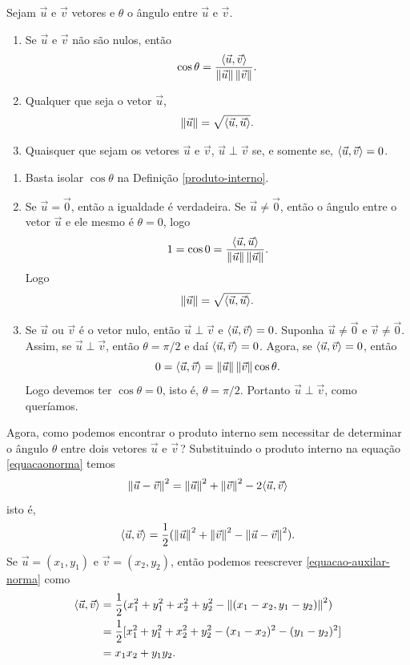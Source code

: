 \begin{proposicao}
    Sejam $\vec{u}$ e $\vec{v}$ vetores e $\theta$ o ângulo entre $\vec{u}$ e $\vec{v}$.
    \begin{enumerate}
        \item Se $\vec{u}$ e $\vec{v}$ não são nulos, então
              \[
                  \cos\theta = \dfrac{\langle \vec{u}, \vec{v} \rangle}{\left\Vert{\vec{u}}\right\Vert\left\Vert{\vec{v}}\right\Vert}.
              \]
        \item Qualquer que seja o vetor $\vec{u}$,
              \[
                  \left\Vert{\vec{u}}\right\Vert = \sqrt{\langle \vec{u}, \vec{u} \rangle}.
              \]
        \item Quaisquer que sejam os vetores $\vec{u}$ e $\vec{v}$, $\vec{u}\perp\vec{v}$ se, e somente se, $\langle \vec{u}, \vec{v} \rangle = 0$.
    \end{enumerate}
\end{proposicao}
\begin{prova}
    \begin{enumerate}
        \item Basta isolar $\cos\theta$ na Definição \ref{produto-interno}.
        \item Se $\vec{u} = \vec{0}$, então a igualdade é verdadeira. Se $\vec{u} \ne \vec{0}$, então o ângulo entre o vetor $\vec{u}$ e ele mesmo é $\theta = 0$, logo
              \[
                  1 = \cos 0 = \dfrac{\langle \vec{u}, \vec{u} \rangle}{\left\Vert{\vec{u}}\right\Vert\left\Vert{\vec{u}}\right\Vert}.
              \]
              Logo
              \[
                  \left\Vert{\vec{u}}\right\Vert = \sqrt{\langle \vec{u}, \vec{u} \rangle}.
              \]
        \item Se $\vec{u}$ ou $\vec{v}$ é o vetor nulo, então $\vec{u}\perp\vec{v}$ e $\langle \vec{u}, \vec{v} \rangle = 0$. Suponha $\vec{u} \ne \vec{0}$ e $\vec{v} \ne \vec{0}$. Assim, se $\vec{u} \perp\vec{v}$, então $\theta = \pi/2$ e daí $\langle \vec{u}, \vec{v} \rangle = 0$. Agora, se $\langle \vec{u}, \vec{v} \rangle = 0$, então
              \[
                  0 = \langle \vec{u}, \vec{v} \rangle = \left\Vert{\vec{u}}\right\Vert\left\Vert{\vec{v}}\right\Vert\cos\theta.
              \]
              Logo devemos ter $\cos\theta = 0$, isto é, $\theta = \pi/2$. Portanto $\vec{u}\perp\vec{v}$, como queríamos.
    \end{enumerate}
\end{prova}

Agora, como podemos encontrar o produto interno sem necessitar de determinar o ângulo $\theta$ entre dois vetores $\vec{u}$ e $\vec{v}$\,? Substituindo o produto interno na equação \eqref{equacaonorma} temos
\[
    \left\Vert{\vec{u} - \vec{v}}\right\Vert^2 = \left\Vert{\vec{u}}\right\Vert^2 + \left\Vert{\vec{v}}\right\Vert^2 - 2\langle \vec{u}, \vec{v} \rangle
\]
isto é,
\begin{align}\label{equacao-auxilar-norma}
    \langle \vec{u}, \vec{v} \rangle = \dfrac{1}{2}(\left\Vert{\vec{u}}\right\Vert^2 + \left\Vert{\vec{v}}\right\Vert^2 - \left\Vert{\vec{u} - \vec{v}}\right\Vert^2).
\end{align}
Se $\vec{u} = (x_1, y_1)$ e $\vec{v} = (x_2, y_2)$, então podemos reescrever \eqref{equacao-auxilar-norma} como
\begin{align*}
    \langle \vec{u}, \vec{v} \rangle & = \dfrac{1}{2}(x_1^2 + y_1^2 + x_2^2 + y_2^2 - \left\Vert{(x_1 - x_2, y_1 - y_2)}\right\Vert^2) \\
                 & = \dfrac{1}{2}[x_1^2 + y_1^2 + x_2^2 + y_2^2 - (x_1 - x_2)^2 - (y_1 - y_2)^2]   \\
                 & = x_1x_2 + y_1y_2.
\end{align*}

